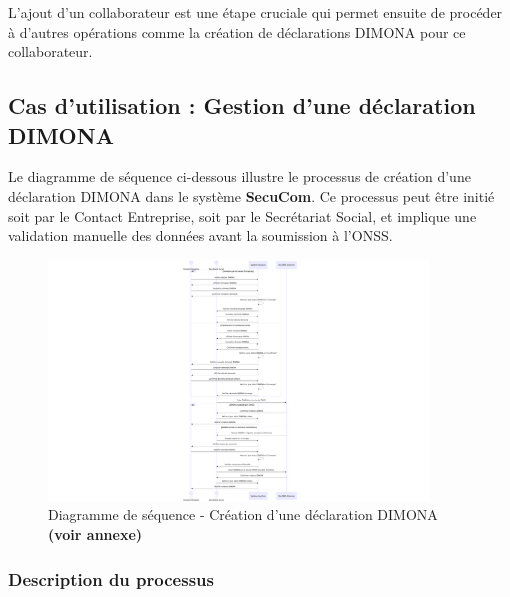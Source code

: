 L'ajout d'un collaborateur est une étape cruciale qui permet ensuite de procéder à d'autres opérations comme la création de déclarations DIMONA pour ce collaborateur.

\newpage
\subsection{Cas d'utilisation : Gestion d'une déclaration DIMONA}

\noindent Le diagramme de séquence ci-dessous illustre le processus de création d'une déclaration DIMONA dans le système \textbf{SecuCom}. Ce processus peut être initié soit par le Contact Entreprise, soit par le Secrétariat Social, et implique une validation manuelle des données avant la soumission à l'ONSS.

\begin{figure}[H]
\centering
\includegraphics[width=0.9\textwidth]{SD_creation_dimona.png}
\caption{Diagramme de séquence - Création d'une déclaration DIMONA \textbf{(voir annexe)}}
\end{figure}

\subsubsection{Description du processus}

